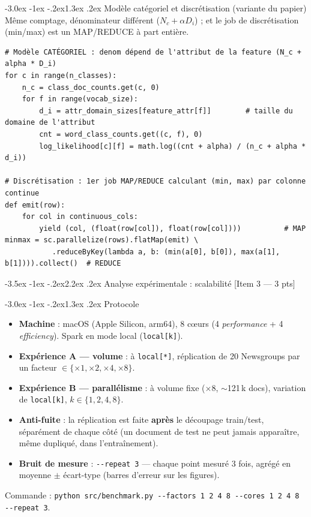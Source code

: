 \documentclass[11pt,a4paper]{article}
\makeatletter
\newcommand{\code}[1]{\lstinline[style=py]!#1!}
\renewcommand\section{\@startsection{section}{1}{\z@}%
  {-3.5ex \@plus -1ex \@minus -.2ex}{2.2ex \@plus.2ex}%
  {\normalfont\Large\bfseries\color{primary}}}
\renewcommand\subsection{\@startsection{subsection}{2}{\z@}%
  {-3.0ex \@plus -1ex \@minus -.2ex}{1.3ex \@plus.2ex}%
  {\normalfont\large\bfseries\color{primary!88!black}}}
\makeatother
\begin{document}
\subsection{Modèle catégoriel et discrétisation (variante du papier)}
Même comptage, dénominateur différent ($N_c + \alpha D_i$) ; et le job de discrétisation
(min/max) est un MAP/REDUCE à part entière.
\begin{lstlisting}[style=py]
# Modèle CATÉGORIEL : denom dépend de l'attribut de la feature (N_c + alpha * D_i)
for c in range(n_classes):
    n_c = class_doc_counts.get(c, 0)
    for f in range(vocab_size):
        d_i = attr_domain_sizes[feature_attr[f]]        # taille du domaine de l'attribut
        cnt = word_class_counts.get((c, f), 0)
        log_likelihood[c][f] = math.log((cnt + alpha) / (n_c + alpha * d_i))

# Discrétisation : 1er job MAP/REDUCE calculant (min, max) par colonne continue
def emit(row):
    for col in continuous_cols:
        yield (col, (float(row[col]), float(row[col])))          # MAP
minmax = sc.parallelize(rows).flatMap(emit) \
           .reduceByKey(lambda a, b: (min(a[0], b[0]), max(a[1], b[1]))).collect()  # REDUCE
\end{lstlisting}

\section{Analyse expérimentale : scalabilité \hfill\normalsize\textmd{[Item 3 --- 3 pts]}}
\label{sec:scalability}

\subsection{Protocole}
\begin{itemize}
  \item \textbf{Machine} : macOS (Apple Silicon, arm64), 8 cœurs (4 \emph{performance} + 4
        \emph{efficiency}). Spark en mode local (\code{local[k]}).
  \item \textbf{Expérience A --- volume} : à \code{local[*]}, réplication de 20 Newsgroups par
        un facteur $\in\{{\times}1,{\times}2,{\times}4,{\times}8\}$.
  \item \textbf{Expérience B --- parallélisme} : à volume fixe (${\times}8$, $\sim$121\,k docs),
        variation de \code{local[k]}, $k\in\{1,2,4,8\}$.
  \item \textbf{Anti-fuite} : la réplication est faite \textbf{après} le découpage train/test,
        séparément de chaque côté (un document de test ne peut jamais apparaître, même
        dupliqué, dans l'entraînement).
  \item \textbf{Bruit de mesure} : \code{--repeat 3} --- chaque point mesuré 3 fois, agrégé en
        moyenne $\pm$ écart-type (barres d'erreur sur les figures).
\end{itemize}
Commande : \code{python src/benchmark.py --factors 1 2 4 8 --cores 1 2 4 8 --repeat 3}.
\end{document}
